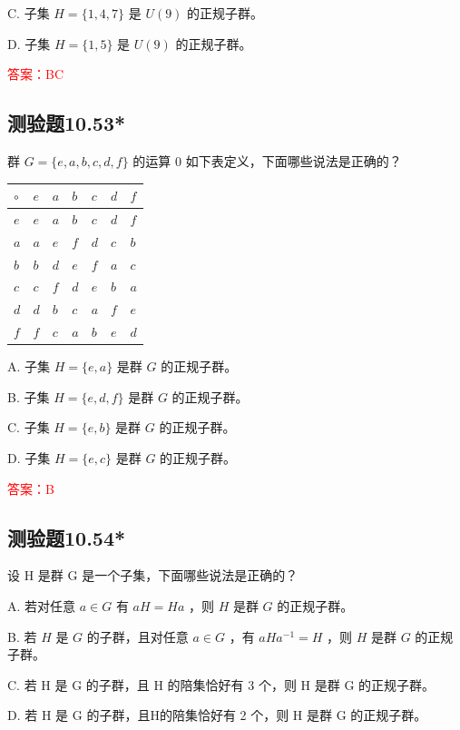 \documentclass[UTF8, heading=true]{ctexart}
\begin{document}
C. 子集 ${H}=\{1,4,7\}$ 是 ${U}(9)$ 的正规子群。

D. 子集 $H=\{1,5\}$ 是 $U(9)$ 的正规子群。

\textcolor{red}{答案：BC}

\subsection{测验题10.53*}

群 $G=\{e, a, b, c, d, f\}$ 的运算 0 如下表定义，下面哪些说法是正确的？

\begin{table}[H]
  \renewcommand{\arraystretch}{1.5}
  \centering
\begin{tabular}{l|llllll}
\hline$\circ$ & $e$ & $a$ & $b$ & $c$ & $d$ & $f$ \\
\hline$e$ & $e$ & $a$ & $b$ & $c$ & $d$ & $f$ \\
$a$ & $a$ & $e$ & $f$ & $d$ & $c$ & $b$ \\
$b$ & $b$ & $d$ & $e$ & $f$ & $a$ & $c$ \\
$c$ & $c$ & $f$ & $d$ & $e$ & $b$ & $a$ \\
$d$ & $d$ & $b$ & $c$ & $a$ & $f$ & $e$ \\
$f$ & $f$ & $c$ & $a$ & $b$ & $e$ & $d$ \\
\hline
\end{tabular}
\end{table}

A. 子集 $H=\{e, a\}$ 是群 $G$ 的正规子群。

B. 子集 $H=\{e, d, f\}$ 是群 $G$ 的正规子群。

C. 子集 $H=\{e, b\}$ 是群 $G$ 的正规子群。

D. 子集 $H=\{e, c\}$ 是群 $G$ 的正规子群。

\textcolor{red}{答案：B}

\subsection{测验题10.54*}

设 H 是群 G 是一个子集，下面哪些说法是正确的？

A. 若对任意 $a \in G$ 有 $a H=H a$ ，则 $H$ 是群 $G$ 的正规子群。

B. 若 $H$ 是 $G$ 的子群，且对任意 $a \in G$ ，有 $a H a^{-1}=H$ ，则 $H$ 是群 $G$ 的正规子群。

C. 若 H 是 G 的子群，且 H 的陪集恰好有 3 个，则 H 是群 G 的正规子群。

D. 若 H 是 G 的子群，且H的陪集恰好有 2 个，则 H 是群 G 的正规子群。
\end{document}
